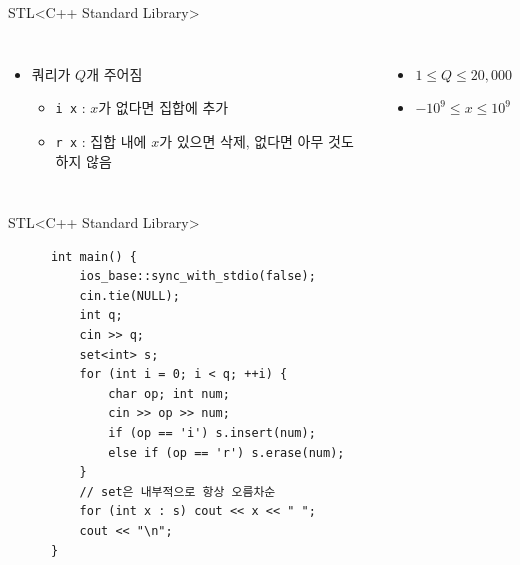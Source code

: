 \begin{frame}{STL}{<C++ Standard Library>}
  \begin{center}
  \end{center}
  \vspace{4mm}
  \begin{columns}[T]
      \begin{itemize}
        \item 쿼리가 $Q$개 주어짐
        \begin{itemize}
          \item \texttt{i x} : $x$가 없다면 집합에 추가
          \item \texttt{r x} : 집합 내에 $x$가 있으면 삭제, 없다면 아무 것도 하지 않음
        \end{itemize}
      \end{itemize}
      \begin{itemize}
        \item $1 \le Q \le 20{,}000$
        \item $-10^9 \le x \le 10^9$
      \end{itemize}
  \end{columns}
\end{frame}

\begin{frame}[fragile]{STL}{<C++ Standard Library>}
  \begin{center}
  \end{center}
  \vspace{1mm}
  \begin{center}
    \begin{verbatim}
      int main() {
          ios_base::sync_with_stdio(false);
          cin.tie(NULL);
          int q;
          cin >> q;
          set<int> s;
          for (int i = 0; i < q; ++i) {
              char op; int num;
              cin >> op >> num;
              if (op == 'i') s.insert(num);
              else if (op == 'r') s.erase(num);
          }
          // set은 내부적으로 항상 오름차순
          for (int x : s) cout << x << " ";
          cout << "\n";
      }
    \end{verbatim}
  \end{center}
\end{frame}

